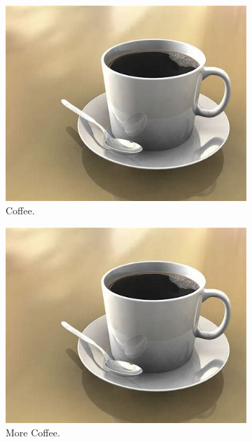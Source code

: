 \documentclass{article}
\begin{document}
	\begin{figure}[h!]
		\centering
		\begin{subfigure}[b]{0.2\linewidth}
			\includegraphics[width=\linewidth]{coffee.jpg}
			\caption{Coffee.}
		\end{subfigure}
		\begin{subfigure}[b]{0.2\linewidth}
			\includegraphics[width=\linewidth]{coffee.jpg}
			\caption{More Coffee.}
		\end{subfigure}
	   	\begin{subfigure}[b]{0.2\linewidth}

\end{subfigure}
\end{figure}
\end{document}
